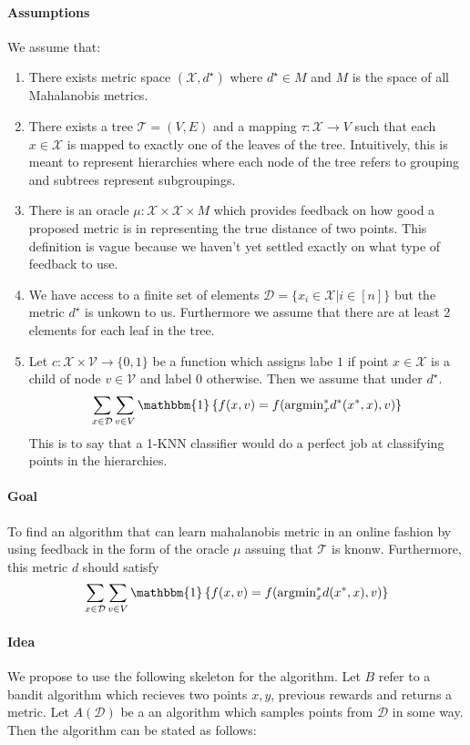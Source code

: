 \documentclass{article}
\begin{document}
\paragraph{Assumptions} We assume that:
\begin{enumerate}
\item
  There exists metric space $(\mathcal{X}, d^\star)$ where $d^\star \in M$ and $M$ is the space of all Mahalanobis metrics.
\item
  There exists a tree $\mathcal{T} = (V, E)$ and a mapping $\tau: \mathcal{X} \to V$ such that each $x \in \mathcal{X}$ is mapped to exactly one of the leaves of the tree. 
  Intuitively, this is meant to represent hierarchies where each node of the tree refers to grouping and subtrees represent subgroupings.
\item
  There is an oracle $\mu:\mathcal{X} \times \mathcal{X} \times M$ which provides feedback on how good a proposed metric is in representing the true distance of two points.
  This definition is vague because we haven't yet settled exactly on what type of feedback to use.
\item 
  We have access to a finite set of elements $\mathcal{D} = \{x_i \in \mathcal{X}| i \in [n] \}$ but the metric $d^\star$ is unkown to us. 
  Furthermore we assume that there are at least 2 elements for each leaf in the tree. 
\item
  Let $c: \mathcal{X} \times \mathcal{V} \to \{0,1\}$ be a function which assigns labe $1$ if point $x \in \mathcal{X}$ is a child of node $v \in \mathcal{V}$ and label $0$ otherwise.
  Then we assume that under $d^\star$. 
  \[ \sum_{x \in \mathcal{D}} \sum_{v \in V} \mathbbm{1}\left\{f(x,v) = f(\text{argmin}_x^* d^*(x^*,x),v)\right\} \] 
  This is to say that a 1-KNN classifier would do a perfect job at classifying points in the hierarchies. 
\end{enumerate}
\paragraph{Goal}
  To find an algorithm that can learn mahalanobis metric in an online fashion by using feedback in the form of the oracle $\mu$ assuing that $\mathcal{T}$ is knonw. 
  Furthermore, this metric $d$ should satisfy 
  \[ \sum_{x \in \mathcal{D}} \sum_{v \in V} \mathbbm{1}\left\{f(x,v) = f(\text{argmin}_x^* d(x^*,x),v)\right\} \] 
\paragraph{Idea}  
We propose to use the following skeleton for the algorithm. Let $B$ refer to a bandit algorithm which recieves two points $x,y$, previous rewards and returns a metric. Let 
$A(\mathcal{D})$ be a an algorithm which samples points from $\mathcal{D}$ in some way. 
Then the algorithm can be stated as follows:
\end{document}
